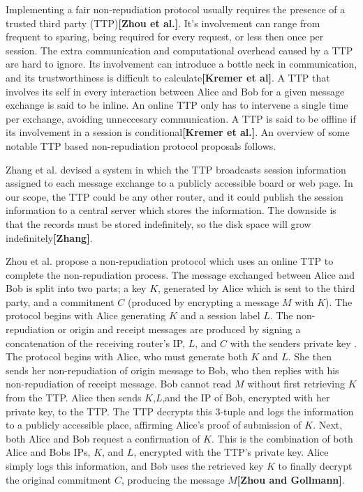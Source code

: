\documentclass[12pt]{article}
\newcommand{\lcite}[1]
{{\bfseries\color{orange}[#1]}}
\begin{document}
			Implementing a fair non-repudiation protocol usually requires the presence of a trusted third party (TTP)\lcite{Zhou et al.}. It's involvement can range from frequent to sparing, being required for every request, or less then once per session. The extra communication and computational overhead caused by a TTP are hard to ignore. Its involvement can introduce a bottle neck in communication, and its trustworthiness is difficult to calculate\lcite{Kremer et al}. A TTP that involves its self in every interaction between Alice and Bob for a given message exchange is said to be inline. An online TTP only has to intervene a single time per exchange, avoiding unneccesary communication. A TTP is said to be offline if its involvement in a session is conditional\lcite{Kremer et al.}. An overview of some notable TTP based non-repudiation protocol proposals follows. 

			Zhang et al. devised a system in which the TTP broadcasts session information assigned to each message exchange to a publicly accessible board or web page. In our scope, the TTP could be any other router, and it could publish the session information to a central server which stores the information. The downside is that the records must be stored indefinitely, so the disk space will grow indefinitely\lcite{Zhang}.

			Zhou et al. propose a non-repudiation protocol which uses an online TTP to complete the non-repudiation process. The message exchanged between Alice and Bob is split into two parts; a key $K$, generated by Alice which is sent to the third party, and a commitment $C$ (produced by encrypting a message $M$ with $K$). The protocol begins with Alice generating $K$ and a session label $L$. The non-repudiation or origin and receipt messages are produced by signing a concatenation of the receiving router's IP, $L$, and $C$ with the senders private key . The protocol begins with Alice, who must generate both $K$ and $L$. She then sends her non-repudiation of origin message to Bob, who then replies with his non-repudiation of receipt message. Bob cannot read $M$ without first retrieving $K$ from the TTP. Alice then sends $K$,$L$,and the IP of Bob, encrypted with her private key, to the TTP. The TTP decrypts this 3-tuple and logs the information to a publicly accessible place, affirming Alice's proof of submission of $K$. Next, both Alice and Bob request a confirmation of $K$. This is the combination of both Alice and Bobs IPs, $K$, and $L$, encrypted with the TTP's private key. Alice simply logs this information, and Bob uses the retrieved key $K$ to finally decrypt the original commitment $C$, producing the message $M$\lcite{Zhou and Gollmann}.
\end{document}
